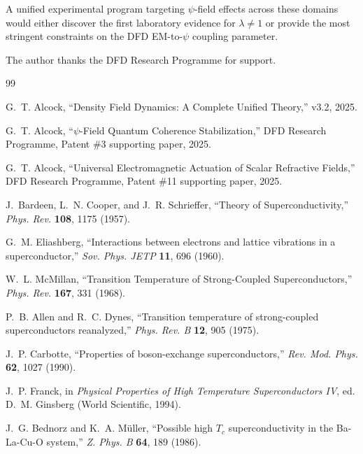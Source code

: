 \documentclass[aps,prb,twocolumn,superscriptaddress,floatfix,nofootinbib,longbibliography]{revtex4-2}
\begin{document}
A unified experimental program targeting $\psi$-field effects across
these domains would either discover the first laboratory evidence for
$\lambda \neq 1$ or provide the most stringent constraints on the
DFD EM-to-$\psi$ coupling parameter.

\begin{acknowledgments}
The author thanks the DFD Research Programme for support.
\end{acknowledgments}



\begin{thebibliography}{99}

G.~T. Alcock, ``Density Field Dynamics: A Complete Unified Theory,''
v3.2, 2025.

G.~T. Alcock, ``$\psi$-Field Quantum Coherence Stabilization,''
DFD Research Programme, Patent \#3 supporting paper, 2025.

G.~T. Alcock, ``Universal Electromagnetic Actuation of Scalar Refractive
Fields,'' DFD Research Programme, Patent \#11 supporting paper, 2025.

J.~Bardeen, L.~N. Cooper, and J.~R. Schrieffer, ``Theory of
Superconductivity,'' \textit{Phys. Rev.} \textbf{108}, 1175 (1957).

G.~M. Eliashberg, ``Interactions between electrons and lattice vibrations
in a superconductor,'' \textit{Sov. Phys. JETP} \textbf{11}, 696 (1960).

W.~L. McMillan, ``Transition Temperature of Strong-Coupled Superconductors,''
\textit{Phys. Rev.} \textbf{167}, 331 (1968).

P.~B. Allen and R.~C. Dynes, ``Transition temperature of strong-coupled
superconductors reanalyzed,'' \textit{Phys. Rev. B} \textbf{12}, 905 (1975).

J.~P. Carbotte, ``Properties of boson-exchange superconductors,''
\textit{Rev. Mod. Phys.} \textbf{62}, 1027 (1990).

J.~P. Franck, in \textit{Physical Properties of High Temperature
Superconductors IV}, ed. D.~M. Ginsberg (World Scientific, 1994).

J.~G. Bednorz and K.~A. M\"uller, ``Possible high $T_c$ superconductivity
in the Ba-La-Cu-O system,'' \textit{Z. Phys. B} \textbf{64}, 189 (1986).


\end{thebibliography}
\end{document}
